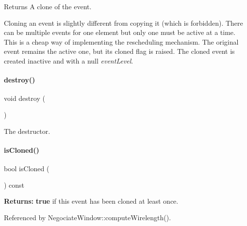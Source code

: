 \begin{DoxyReturn}{Returns}
A clone of the event.
\end{DoxyReturn}
Cloning an event is slightly different from copying it (which is forbidden). There can be multiple events for one {\ttfamily element} but only one must be active at a time. This is a cheap way of implementing the rescheduling mechanism. The original event remains the active one, but it\textquotesingle{}s cloned flag is raised. The cloned event is created inactive and with a null {\itshape event\+Level}. \mbox{\label{classKite_1_1RoutingEvent_a3a80b6032f86a56bec74609034b3246f}} 
\paragraph{\texorpdfstring{destroy()}{destroy()}}
{\footnotesize\ttfamily void destroy (\begin{DoxyParamCaption}{ }\end{DoxyParamCaption})}

The destructor. \mbox{\label{classKite_1_1RoutingEvent_a213956f734f660863e55f8f398cf932a}} 
\paragraph{\texorpdfstring{is\+Cloned()}{isCloned()}}
{\footnotesize\ttfamily bool is\+Cloned (\begin{DoxyParamCaption}{ }\end{DoxyParamCaption}) const\hspace{0.3cm}{\ttfamily [inline]}}

{\bfseries Returns\+:} {\bfseries true} if this event has been cloned at least once. 

Referenced by Negociate\+Window\+::compute\+Wirelength().

\mbox{\label{classKite_1_1RoutingEvent_a5bc2a781be2586924afce4e4a4ea6697}} 
